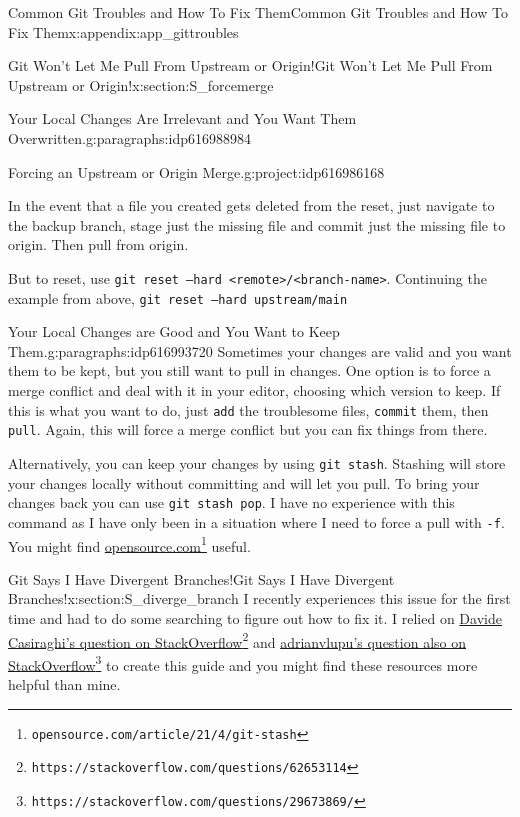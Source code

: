 \documentclass[oneside,10pt,]{book}
\newcommand{\mono}[1]{\texttt{#1}}
\begin{document}
\begin{appendixptx}{Common Git Troubles and How To Fix Them}{}{Common Git Troubles and How To Fix Them}{}{}{x:appendix:app_gittroubles}
\begin{sectionptx}{Git Won't Let Me Pull From Upstream or Origin!}{}{Git Won't Let Me Pull From Upstream or Origin!}{}{}{x:section:S_forcemerge}
\begin{paragraphs}{Your Local Changes Are Irrelevant and You Want Them Overwritten.}{g:paragraphs:idp616988984}
\begin{project}{Forcing an Upstream or Origin Merge.}{g:project:idp616986168}
\begin{enumerate}[font=\bfseries,label=(\alph*),ref=\alph*]
\par
In the event that a file you created gets deleted from the reset, just navigate to the backup branch, stage just the missing file and commit just the missing file to origin. Then pull from origin.%
\par
But to reset, use \mono{git reset --hard <remote>/<branch-name>}. Continuing the example from above, \mono{git reset --hard upstream/main}%
\end{enumerate}
\end{project}%
\end{paragraphs}%
\begin{paragraphs}{Your Local Changes are Good and You Want to Keep Them.}{g:paragraphs:idp616993720}%
Sometimes your changes are valid and you want them to be kept, but you still want to pull in changes. One option is to force a merge conflict and deal with it in your editor, choosing which version to keep. If this is what you want to do, just \mono{add} the troublesome files, \mono{commit} them, then \mono{pull}. Again, this will force a merge conflict but you can fix things from there.%
\par
Alternatively, you can keep your changes by using \mono{git stash}. Stashing will store your changes locally without committing and will let you pull. To bring your changes back you can use \mono{git stash pop}. I have no experience with this command as I have only been in a situation where I need to force a pull with \mono{-f}. You might find \href{https://opensource.com/article/21/4/git-stash}{opensource.com}\footnote{\nolinkurl{opensource.com/article/21/4/git-stash}\label{g:fn:idp616998712}} useful.%
\end{paragraphs}%
\end{sectionptx}
%
%
\typeout{************************************************}
\typeout{************************************************}
%
\begin{sectionptx}{Git Says I Have Divergent Branches!}{}{Git Says I Have Divergent Branches!}{}{}{x:section:S_diverge_branch}
I recently experiences this issue for the first time and had to do some searching to figure out how to fix it. I relied on \href{https://stackoverflow.com/questions/62653114}{Davide Casiraghi's question on StackOverflow}\footnote{\nolinkurl{https://stackoverflow.com/questions/62653114}\label{g:fn:idp616997816}} and \href{https://stackoverflow.com/questions/29673869/}{adrianvlupu's question also on StackOverflow}\footnote{\nolinkurl{https://stackoverflow.com/questions/29673869/}\label{g:fn:idp617002296}} to create this guide and you might find these resources more helpful than mine.%

\end{sectionptx}
\end{appendixptx}
\end{document}

